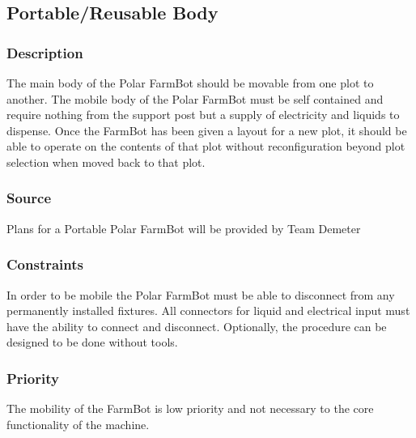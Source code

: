 
\subsection{Portable/Reusable Body}
\subsubsection{Description}
The main body of the Polar FarmBot should be movable from one plot to another. The mobile body of the Polar FarmBot must be self contained and require nothing from the support post but a supply of electricity and liquids to dispense. Once the FarmBot has been given a layout for a new plot, it should be able to operate on the contents of that plot without reconfiguration beyond plot selection when moved back to that plot.
\subsubsection{Source}
Plans for a Portable Polar FarmBot will be provided by Team Demeter
\subsubsection{Constraints}
In order to be mobile the Polar FarmBot must be able to disconnect from any permanently installed fixtures. All connectors for liquid and electrical input must have the ability to connect and disconnect. Optionally, the procedure can be designed to be done without tools.
\subsubsection{Priority}
The mobility of the FarmBot is low priority and not necessary to the core functionality of the machine.
